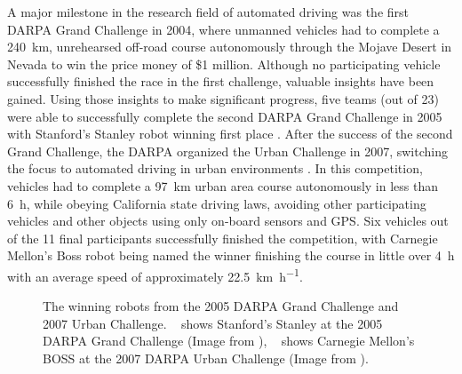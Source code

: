 A major milestone in the research field of automated driving was the first \ac{DARPA} Grand Challenge in 2004, where unmanned vehicles had to complete a \SI{240}{\kilo\meter}, unrehearsed off-road course autonomously through the Mojave Desert in Nevada to win the price money of \$1 million.
Although no participating vehicle successfully finished the race \cite{Bacha2004} in the first challenge, valuable insights have been gained.
Using those insights to make significant progress, five teams (out of 23) were able to successfully complete the second \ac{DARPA} Grand Challenge in 2005 with Stanford's Stanley robot winning first place \cite{Thrun2006}.
After the success of the second Grand Challenge, the \ac{DARPA} organized the Urban Challenge in 2007, switching the focus to automated driving in urban environments \cite{Buehler2009}.
In this competition, vehicles had to complete a \SI{97}{\kilo\meter} urban area course autonomously in less than \SI{6}{\hour}, while obeying California state driving laws, avoiding other participating vehicles and other objects using only on-board sensors and \ac{GPS}.
Six vehicles out of the 11 final participants successfully finished the competition, with Carnegie Mellon's Boss robot \cite{Urmson.2008} being named the winner finishing the course in little over \SI{4}{\hour} with an average speed of approximately \SI[per-mode=symbol]{22.5}{\kilo\meter\per\hour}.

\begin{figure}[t!]
	\centering
	\caption{The winning robots from the 2005 \ac{DARPA} Grand Challenge and 2007 Urban Challenge. ~\protect{} shows Stanford's Stanley at the 2005 \ac{DARPA} Grand Challenge (Image from \cite{Thrun2006}), ~\protect{} shows Carnegie Mellon's BOSS at the 2007 \ac{DARPA} Urban Challenge (Image from \cite{Urmson.2008}).}\label{fig:darpa_chal}
\end{figure}

